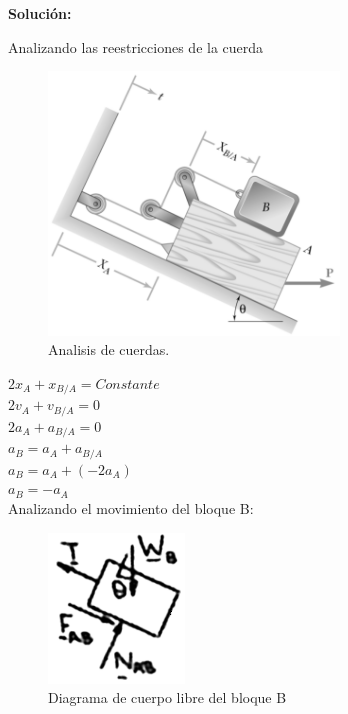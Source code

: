 \documentclass[a4paper,11pt]{scrartcl}
\begin{document}
\textbf{Solución:}

\begin{center}
Analizando las reestricciones de la cuerda\\

\begin{figure}[H]
  \centering
  \includegraphics[height=7cm]{22_2}
  \caption{Analisis de cuerdas.}
  \label{fig:22_2}
\end{figure}

$2 x_A + x_{B/A} = Constante$\\
\hfill \break
$2 v_A + v_{B/A} = 0$\\
\hfill \break
$2 a_A + a_{B/A} = 0$\\
\hfill \break
$a_B = a_A + a_{B/A}$\\
\hfill \break
$a_B = a_A + ( - 2 a_A )$\\
\hfill \break
$a_B = - a_A$\\
\hfill \break
Analizando el movimiento del bloque B:\\

\begin{figure}[H]
  \centering
  \includegraphics[height=4cm]{22_3}
  \caption{Diagrama de cuerpo libre del bloque B}
  \label{fig:22_3}
\end{figure}


\end{center}
\end{document}
